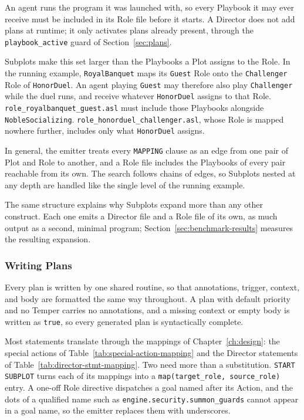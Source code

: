 An agent runs the program it was launched with, so every Playbook it may ever receive must be included in its Role file before it starts. A Director does not add plans at runtime; it only activates plans already present, through the \lstinline|playbook_active| guard of Section~\ref{sec:plans}.
 
Subplots make this set larger than the Playbooks a Plot assigns to the Role. In the running example, \lstinline|RoyalBanquet| maps its \lstinline|Guest| Role onto the \lstinline|Challenger| Role of \lstinline|HonorDuel|. An agent playing \lstinline|Guest| may therefore also play \lstinline|Challenger| while the duel runs, and receive whatever \lstinline|HonorDuel| assigns to that Role. \lstinline|role_royalbanquet_guest.asl| must include those Playbooks alongside \lstinline|NobleSocializing|. \lstinline|role_honorduel_challenger.asl|, whose Role is mapped nowhere further, includes only what \lstinline|HonorDuel| assigns.
 
In general, the emitter treats every \lstinline|MAPPING| clause as an edge from one pair of Plot and Role to another, and a Role file includes the Playbooks of every pair reachable from its own. The search follows chains of edges, so Subplots nested at any depth are handled like the single level of the running example.
 
The same structure explains why Subplots expand more than any other construct. Each one emits a Director file and a Role file of its own, as much output as a second, minimal program; Section~\ref{sec:benchmark-results} measures the resulting expansion.
 
\subsubsection{Writing Plans}
 
Every plan is written by one shared routine, so that annotations, trigger, context, and body are formatted the same way throughout. A plan with default priority and no Temper carries no annotations, and a missing context or empty body is written as \lstinline|true|, so every generated plan is syntactically complete.
 
Most statements translate through the mappings of Chapter~\ref{ch:design}: the special actions of Table~\ref{tab:special-action-mapping} and the Director statements of Table~\ref{tab:director-stmt-mapping}. Two need more than a substitution. \lstinline|START SUBPLOT| turns each of its mappings into a \lstinline|map(target_role, source_role)| entry. A one-off Role directive dispatches a goal named after its Action, and the dots of a qualified name such as \lstinline|engine.security.summon_guards| cannot appear in a goal name, so the emitter replaces them with underscores.
 

